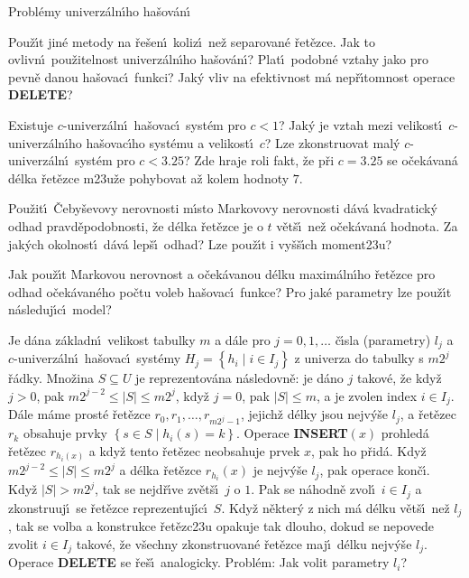 \subhead
Probl\'emy univerz\'aln\'\i ho ha\v sov\'an\'\i
\endsubhead
\smallskip

\flushpar Pou\v z\'\i t jin\'e metody na \v re\v sen\'\i\ koliz\'\i\ ne\v z 
separovan\'e \v ret\v ezce. Jak to ovlivn\'\i\ pou\v zitelnost 
univerz\'aln\'\i ho ha\v sov\'an\'\i ? Plat\'\i\ podobn\'e vztahy jako pro 
pevn\v e danou ha\v sovac\'\i\ funkci? Jak\'y vliv na efektivnost 
m\'a nep\v r\'\i tomnost operace {\bf DELETE}?
\medskip

\flushpar Existuje $c$-univerz\'aln\'\i\ ha\v sovac\'\i\ syst\'em pro 
$c<1$? Jak\'y je vztah mezi velikost\'\i\ $c$-univerz\'aln\'\i\-ho 
ha\v sovac\'\i ho syst\'emu a velikost\'\i\ $c$? Lze zkonstruovat 
mal\'y $c$-univerz\'aln\'\i\ syst\'em pro $c<3.25$? Zde hraje roli 
fakt, \v ze p\v ri $c=3.25$ se o\v cek\'avan\'a d\'elka \v ret\v ezce 
m\accent23u\v ze pohybovat a\v z kolem hodnoty $7$.
\medskip

\flushpar Pou\v zit\'\i\ \v Ceby\v sevovy nerovnosti m\'\i sto 
Markovovy nerovnosti d\'av\'a kvadratick\'y odhad 
prav\-d\v e\-podobnosti, \v ze d\'elka \v ret\v ezce je o $t$ v\v et\v s\'\i\ ne\v z 
o\v cek\'avan\'a hodnota. Za jak\'ych okolnost\'\i\ d\'av\'a lep\v s\'\i\ 
odhad? Lze pou\v z\'\i t i vy\v s\v s\'\i ch moment\accent23u?
\medskip

\flushpar Jak pou\v z\'\i t Markovou nerovnost a o\v cek\'avanou 
d\'elku maxim\'al\-n\'\i\-ho \v ret\v ezce pro odhad o\v cek\'a\-va\-n\'eho 
po\v ctu voleb ha\v sovac\'\i\ funk\-ce? 
Pro jak\'e parametry lze pou\v z\'\i t n\'asleduj\'\i c\'\i\ model?

\flushpar Je d\'ana z\'akladn\'\i\ velikost tabulky $m$ a d\'ale pro $
j=0,1,\dots$ 
\v c\'\i sla (parametry) $l_j$ a $c$-univer\-z\'al\-n\'\i\ ha\v sovac\'\i\ syst\'emy 
$H_j=\left\{h_i\mid i\in I_j\right\}$ z univerza do tabulky s $m2^j$ \v r\'adky.\newline 
Mno\v zina $S\subseteq U$ je reprezentov\'ana n\'asledovn\v e:  je d\'ano $
j$ 
tako\-v\'e, \v ze kdy\v z $j>0$, pak $m2^{j-2}\le |S|\le m2^j$, kdy\v z $
j=0$, pak 
$|S|\le m$, a je zvolen index $i\in I_j$.  D\'ale m\'ame prost\'e \v ret\v ezce 
$r_0,r_1,\dots,r_{m2^j-1}$, jejich\v z d\'elky jsou nejv\'y\v se $
l_j$, a \v ret\v ezec $r_k$ 
obsahuje prvky $\left\{s\in S\mid h_i\left(s\right)=k\right\}$.\newline 
Operace {\bf INSERT$\left(x\right)$} prohled\'a \v ret\v ezec $r_{h_i\left(x\right)}$ a kdy\v z tento 
\v re\-t\v e\-zec neobsahuje prvek $x$, pak ho p\v rid\'a.  Kdy\v z 
$m2^{j-2}\le |S|\le m2^j$ a d\'elka \v ret\v ezce $r_{h_i}\left(x\right)$ je nejv\'y\v se $
l_j$, pak 
operace kon\v c\'\i .  Kdy\v z $|S|>m2^j$, tak se nejd\v r\'\i ve zv\v et\v s\'\i\ $
j$ o $1$.  
Pak se n\'ahodn\v e zvol\'\i\ $i\in I_j$ a zkonstruuj\'\i\ se \v ret\v ezce 
reprezentuj\'\i c\'\i\ $S$.  Kdy\v z n\v ekter\'y z nich m\'a d\'elku v\v et\v s\'\i\ ne\v z $
l_j$, 
tak se volba a konstrukce \v ret\v ezc\accent23u opakuje tak dlouho, 
dokud se nepovede zvolit $i\in I_j$ takov\'e, \v ze v\v sechny 
zkonstruovan\'e \v ret\v ezce maj\'\i\ d\'elku nejv\'y\v se $l_j$.  Operace {\bf DELETE }
se \v re\v s\'\i\ analogicky.\newline 
Probl\'em:  Jak volit parametry $l_i$?  
\medskip


